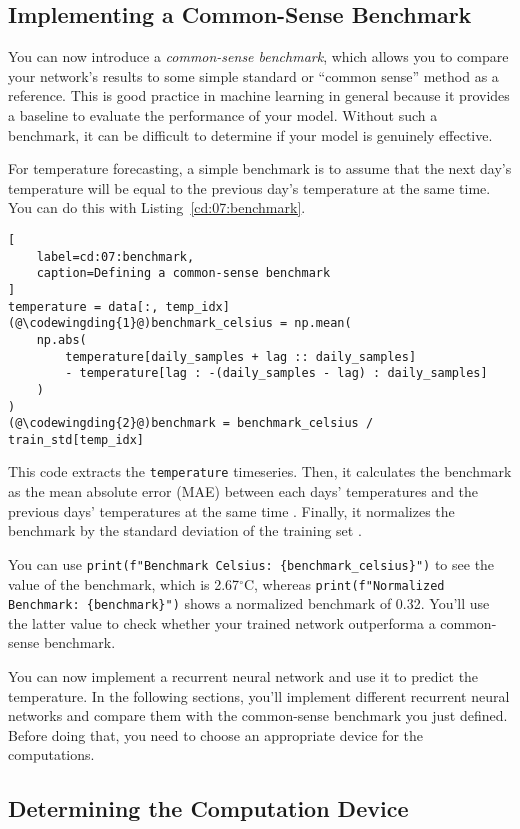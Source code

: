 \subsection{Implementing a Common-Sense Benchmark}

You can now introduce a \emph{common-sense benchmark}, which allows you to compare your network's results to some simple standard or ``common sense'' method as a reference. This is good practice in machine learning in general because it provides a baseline to evaluate the performance of your model. Without such a benchmark, it can be difficult to determine if your model is genuinely effective.

For temperature forecasting, a simple benchmark is to assume that the next day's temperature will be equal to the previous day's temperature at the same time.
You can do this with Listing~\ref{cd:07:benchmark}.
\begin{lstlisting}[
    label=cd:07:benchmark,
    caption=Defining a common-sense benchmark
]
temperature = data[:, temp_idx]
(@\codewingding{1}@)benchmark_celsius = np.mean(
    np.abs(
        temperature[daily_samples + lag :: daily_samples] 
        - temperature[lag : -(daily_samples - lag) : daily_samples]
    )
)
(@\codewingding{2}@)benchmark = benchmark_celsius / train_std[temp_idx]
\end{lstlisting}
This code extracts the \lstinline{temperature} timeseries. Then, it calculates the benchmark as the mean absolute error (MAE) between each days' temperatures and the previous days' temperatures at the same time .
Finally, it normalizes the benchmark by the standard deviation of the training set .

You can use \lstinline|print(f"Benchmark Celsius: {benchmark_celsius}")| to see the value of the benchmark, which is 2.67$^\circ$C, whereas \lstinline|print(f"Normalized Benchmark: {benchmark}")| shows a normalized benchmark of 0.32.
You'll use the latter value to check whether your trained network outperforma a common-sense benchmark.

You can now implement a recurrent neural network and use it to predict the temperature.
In the following sections, you'll implement different recurrent neural networks and compare them with the common-sense benchmark you just defined.
Before doing that, you need to choose an appropriate device for the computations.

\subsection{Determining the Computation Device}

